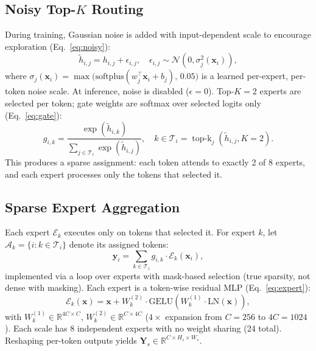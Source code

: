 \documentclass[10pt,a4paper,twocolumn,twoside]{article}
\newcommand{\bx}{\mathbf{x}}
\newcommand{\bY}{\mathbf{Y}}
\newcommand{\by}{\mathbf{y}}
\newcommand{\E}{\mathcal{E}}
\newcommand{\reals}{\mathbb{R}}
\DeclareMathOperator*{\topk}{top\text{-}k}
\begin{document}
\subsection{Noisy Top-$K$ Routing}
During training, Gaussian noise is added with input-dependent scale to encourage exploration (Eq.~\eqref{eq:noisy}):
\begin{equation}
  \tilde{h}_{i,j} = h_{i,j} + \epsilon_{i,j}, \quad \epsilon_{i,j} \sim \mathcal{N}(0, \sigma_j^2(\bx_i)),
  \label{eq:noisy}
\end{equation}
where $\sigma_j(\bx_i) = \max\bigl(\text{softplus}(w_j^\top \bx_i + b_j),\, 0.05\bigr)$ is a learned per-expert, per-token noise scale.
At inference, noise is disabled ($\epsilon{=}0$).
Top-$K{=}2$ experts are selected per token; gate weights are softmax over selected logits only (Eq.~\eqref{eq:gate}):
\begin{equation}
  g_{i,k} = \frac{\exp(\tilde{h}_{i,k})}{\sum_{j \in \mathcal{T}_i} \exp(\tilde{h}_{i,j})}, \quad k \in \mathcal{T}_i = \topk_j(\tilde{h}_{i,j}, K{=}2).
  \label{eq:gate}
\end{equation}
This produces a sparse assignment: each token attends to exactly 2 of 8 experts, and each expert processes only the tokens that selected it.

\subsection{Sparse Expert Aggregation}
Each expert $\E_k$ executes only on tokens that selected it.
For expert $k$, let $\mathcal{A}_k = \{i : k \in \mathcal{T}_i\}$ denote its assigned tokens:
\begin{equation}
  \by_i = \sum_{k \in \mathcal{T}_i} g_{i,k} \cdot \E_k(\bx_i),
  \label{eq:mixture}
\end{equation}
implemented via a loop over experts with mask-based selection (true sparsity, not dense with masking).
Each expert is a token-wise residual MLP (Eq.~\eqref{eq:expert}):
\begin{equation}
  \E_k(\bx) = \bx + W_k^{(2)} \cdot \text{GELU}(W_k^{(1)} \cdot \text{LN}(\bx)),
  \label{eq:expert}
\end{equation}
with $W_k^{(1)} \in \reals^{4C \times C}$, $W_k^{(2)} \in \reals^{C \times 4C}$ ($4{\times}$ expansion from $C{=}256$ to $4C{=}1024$).
Each scale has 8 independent experts with no weight sharing (24 total).
Reshaping per-token outputs yields $\bY_s \in \reals^{C \times H_s \times W_s}$.
\end{document}
